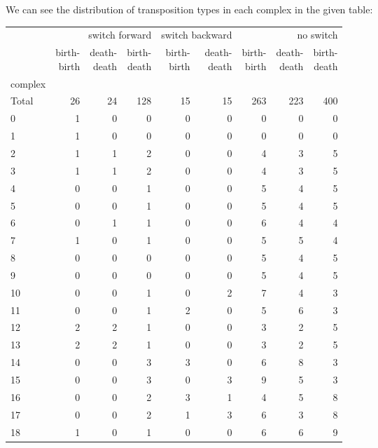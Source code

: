 \documentclass{article}
\begin{document}
\par We can see the distribution of transposition types in each complex in the given table:
\begin{center}
\begin{tabular}{lrrrrrrrr}
\toprule
& \multicolumn{3}{r}{switch forward} & \multicolumn{2}{r}{switch backward} & \multicolumn{3}{r}{no switch} \\
& \makecell{birth-\\birth} & \makecell{death-\\death} & \makecell{birth-\\death} & \makecell{birth-\\birth} & \makecell{death-\\death} & \makecell{birth-\\birth} & \makecell{death-\\death} & \makecell{birth-\\death} \\
complex &  &  &  &  &  &  &  &  \\
\midrule
Total & 26 & 24 & 128 & 15 & 15 & 263 & 223 & 400 \\
0 & 1 & 0 & 0 & 0 & 0 & 0 & 0 & 0 \\
1 & 1 & 0 & 0 & 0 & 0 & 0 & 0 & 0 \\
2 & 1 & 1 & 2 & 0 & 0 & 4 & 3 & 5 \\
3 & 1 & 1 & 2 & 0 & 0 & 4 & 3 & 5 \\
4 & 0 & 0 & 1 & 0 & 0 & 5 & 4 & 5 \\
5 & 0 & 0 & 1 & 0 & 0 & 5 & 4 & 5 \\
6 & 0 & 1 & 1 & 0 & 0 & 6 & 4 & 4 \\
7 & 1 & 0 & 1 & 0 & 0 & 5 & 5 & 4 \\
8 & 0 & 0 & 0 & 0 & 0 & 5 & 4 & 5 \\
9 & 0 & 0 & 0 & 0 & 0 & 5 & 4 & 5 \\
10 & 0 & 0 & 1 & 0 & 2 & 7 & 4 & 3 \\
11 & 0 & 0 & 1 & 2 & 0 & 5 & 6 & 3 \\
12 & 2 & 2 & 1 & 0 & 0 & 3 & 2 & 5 \\
13 & 2 & 2 & 1 & 0 & 0 & 3 & 2 & 5 \\
14 & 0 & 0 & 3 & 3 & 0 & 6 & 8 & 3 \\
15 & 0 & 0 & 3 & 0 & 3 & 9 & 5 & 3 \\
16 & 0 & 0 & 2 & 3 & 1 & 4 & 5 & 8 \\
17 & 0 & 0 & 2 & 1 & 3 & 6 & 3 & 8 \\
18 & 1 & 0 & 1 & 0 & 0 & 6 & 6 & 9 \\

\end{tabular}
\end{center}
\end{document}
